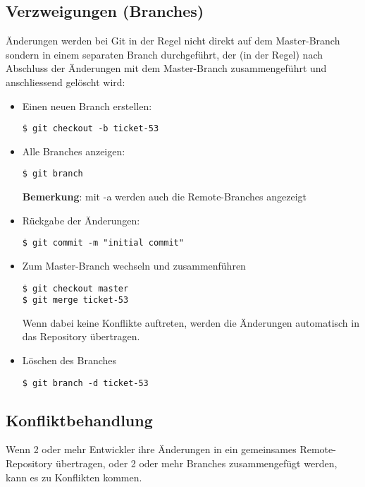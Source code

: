 \subsection{Verzweigungen (Branches)}
Änderungen werden bei Git in der Regel nicht direkt auf dem
Master-Branch sondern in einem separaten Branch durchgeführt, der
(in der Regel)
nach Abschluss der Änderungen mit dem Master-Branch zusammengeführt und
anschliessend gelöscht wird:
\begin{itemize}
\item Einen neuen Branch erstellen:
\begin{lstlisting}
$ git checkout -b ticket-53
\end{lstlisting}
\item Alle Branches anzeigen:
  \begin{lstlisting}
$ git branch
  \end{lstlisting}
{\bfseries Bemerkung}: mit -a werden auch die Remote-Branches angezeigt
\item Rückgabe der Änderungen:
  \begin{lstlisting}
$ git commit -m "initial commit"
  \end{lstlisting}
\item Zum Master-Branch wechseln und zusammenführen
  \begin{lstlisting}
$ git checkout master
$ git merge ticket-53
  \end{lstlisting}
Wenn dabei keine Konflikte auftreten, werden die Änderungen
automatisch in das Repository übertragen.
\item Löschen des Branches
  \begin{lstlisting}
$ git branch -d ticket-53
  \end{lstlisting}
\end{itemize}
%
\newslide
\subsection{Konfliktbehandlung}
Wenn 2 oder mehr Entwickler ihre Änderungen in ein gemeinsames
Remote-Repository übertragen, oder 2 oder mehr Branches zusammengefügt
werden, kann es zu Konflikten kommen.

